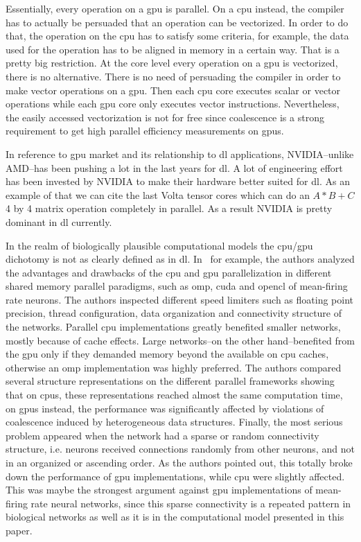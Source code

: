 \documentclass[11pt,a4paper]{article}
\begin{document}
Essentially, every operation on a \gls{gpu} is parallel. On a \gls{cpu} instead, the compiler has to actually be persuaded that an operation can be vectorized. In order to do that, the operation on the \gls{cpu} has to satisfy some criteria, for example, the data used for the operation has to be aligned in memory in a certain way. That is a pretty big restriction. At the core level every operation on a \gls{gpu} is vectorized, there is no alternative. There is no need of persuading the compiler in order to make vector operations on a \gls{gpu}. Then each \gls{cpu} core executes scalar or vector operations while each \gls{gpu} core only executes vector instructions. Nevertheless, the easily accessed vectorization is not for free since coalescence is a strong requirement to get high parallel efficiency measurements on \glspl{gpu}.

In reference to \gls{gpu} market and its relationship to \gls{dl} applications, NVIDIA--unlike AMD--has been pushing a lot in the last years for \gls{dl}. A lot of engineering effort has been invested by NVIDIA to make their hardware better suited for \gls{dl}. As an example of that we can cite the last Volta tensor cores which can do an $A*B+C$ 4 by 4 matrix operation completely in parallel. As a result NVIDIA is pretty dominant in \gls{dl} currently.

In the realm of biologically plausible computational models the \gls{cpu}/\gls{gpu} dichotomy is not as clearly defined as in \gls{dl}. In~\cite{doi:10.3109/0954898X.2012.739292} for example, the authors analyzed the advantages and drawbacks of the \gls{cpu} and \gls{gpu} parallelization in different shared memory parallel paradigms, such as \gls{omp}, \gls{cuda} and \gls{opencl} of mean-firing rate neurons. The authors inspected different speed limiters such as floating point precision, thread configuration, data organization and connectivity structure of the networks. Parallel \gls{cpu} implementations greatly benefited smaller networks, mostly because of cache effects. Large networks--on the other hand--benefited from the \gls{gpu} only if they demanded memory beyond the available on \gls{cpu} caches, otherwise an \gls{omp} implementation was highly preferred. The authors compared several structure representations on the different parallel frameworks showing that on \glspl{cpu}, these representations reached almost the same computation time, on \glspl{gpu} instead, the performance was significantly affected by violations of coalescence induced by heterogeneous data structures. Finally, the most serious problem appeared when the network had a sparse or random connectivity structure, i.e. neurons received connections randomly from other neurons, and not in an organized or ascending order. As the authors pointed out, this totally broke down the performance of \gls{gpu} implementations, while \gls{cpu} were slightly affected. This was maybe the strongest argument against \gls{gpu} implementations of mean-firing rate neural networks, since this sparse connectivity is a repeated pattern in biological networks as well as it is in the computational model presented in this paper.
\end{document}
